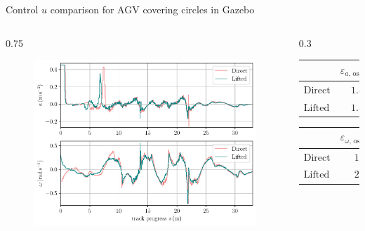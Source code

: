 \documentclass[10pt,aspectratio=1610]{beamer} %
\begin{document}
\begin{frame}{Control $u$ comparison for AGV covering circles in Gazebo}
\begin{columns}[onlytextwidth]
	\begin{column}{0.75\textwidth}
	\begin{figure}[h!tbp]
		\includegraphics[scale=0.65]{figures/u}
		\end{figure}
	\end{column}
	\begin{column}{0.3\textwidth}
		\begin{table}[h!tbp]
			\small
			\begin{center}
				\begin{tabular}{lccccl}\toprule
					& $\varepsilon_{a,\,\mathrm{osc}}\,(\mathrm{m\,s^{-2}})$\\
					\midrule
					$\mathrm{Direct}$& $1.58\cdot10^{-2}$\\
					$\mathrm{Lifted}$& $1.56\cdot10^{-2}$\\
					\bottomrule
				\end{tabular}
			\end{center}
		\end{table}

		\begin{table}[h!tbp]
			\small
			\begin{center}
				\begin{tabular}{lccccl}\toprule
					& $\varepsilon_{\omega,\,\mathrm{osc}}\,(\mathrm{rad\,s^{-1}})$\\
					\midrule
					$\mathrm{Direct}$& $1.57\cdot10^{-2}$\\
					$\mathrm{Lifted}$& $2.25\cdot10^{-2}$\\
					\bottomrule
				\end{tabular}
			\end{center}
		\end{table}
	\end{column}
\end{columns}
\end{frame}
\end{document}
